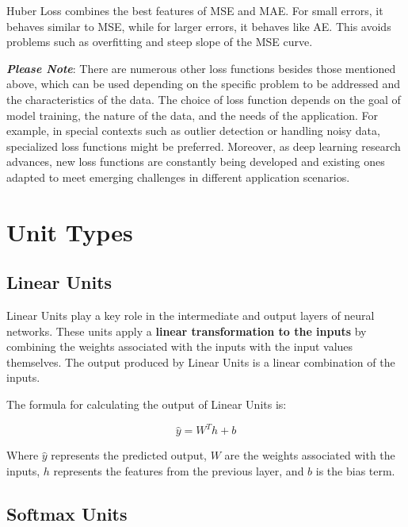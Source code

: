 Huber Loss combines the best features of MSE and MAE. For small errors, it behaves similar to MSE, while for larger errors, it behaves like AE. This avoids problems such as overfitting and steep slope of the MSE curve.

\textit{\textbf{Please Note}}: There are numerous other loss functions besides those mentioned above, which can be used depending on the specific problem to be addressed and the characteristics of the data. The choice of loss function depends on the goal of model training, the nature of the data, and the needs of the application. For example, in special contexts such as outlier detection or handling noisy data, specialized loss functions might be preferred. Moreover, as deep learning research advances, new loss functions are constantly being developed and existing ones adapted to meet emerging challenges in different application scenarios. 

\section{Unit Types}

\subsection{Linear Units}

Linear Units play a key role in the intermediate and output layers of neural networks. These units apply a \textbf{linear transformation to the inputs} by combining the weights associated with the inputs with the input values themselves. The output produced by Linear Units is a linear combination of the inputs.

The formula for calculating the output of Linear Units is:
{\Large
\begin{ceqn}
\begin{equation*}
\hat{y} = W^T h + b
\end{equation*}
\end{ceqn}
}
\vspace{-0.6cm}

Where \( \hat{y} \) represents the predicted output, \( W \) are the weights associated with the inputs, \( h \) represents the features from the previous layer, and \( b \) is the bias term.

\subsection{Softmax Units}

